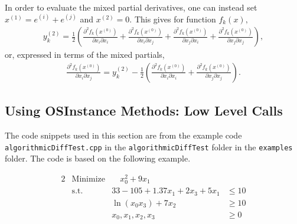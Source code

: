 \documentclass[11pt]{article}
\newcommand{\DD}[3]{ \frac{\partial^2 #1}{\partial #2 \partial #3} }
\renewcommand{\_}{{\char"5F}}
\renewcommand{\{}{{\char"7B}}
\renewcommand{\}}{{\char"7D}}
\renewcommand{\^}{{\char"0D}}
\renewcommand{\'}{{\char"0D}}
\begin{document}
\begin{enumerate}[Step 1:]
In order to evaluate the mixed partial derivatives, one can instead set $x^{(1)} = e^{(i)} + e^{(j)}$ and $x^{(2)} = 0.$    This gives for function $f_{k}(x),$
\begin{eqnarray}
y^{(2)}_{k} =  \frac{1}{2} \left( \DD{f_{k}(x^{(0)})}{x_{i}}{x_{i}}  +   \DD{f_{k}(x^{(0)})}{x_{i}}{x_{j}} 
+  \DD{f_{k}(x^{(0)})}{x_{j}}{x_{i}} +  \DD{f_{k}(x^{(0)})}{x_{j}}{x_{j}}  \right), \label{eq:forward2Resultb}
\end{eqnarray}
or, expressed in terms of the mixed partials,
\begin{eqnarray}
  \DD{f_{k}(x^{(0)})}{x_{i}}{x_{j}}  = y_{k}^{(2)}  -  \frac{1}{2} \left( \DD{f_{k}(x^{(0)})}{x_{i}}{x_{i}}  
+  \DD{f_{k}(x^{(0)})}{x_{j}}{x_{j}}  \right). \label{eq:forward2Resultc}
\end{eqnarray}




\subsection{Using OSInstance Methods: Low Level Calls}\label{section:lowlevelADcalls}

  The code snippets used in this section  are from the example code {\tt algorithmicDiffTest.cpp} in the
{\tt algorithmicDiffTest} folder in the {\tt examples} folder.  The  code is based on the following example.

\begin{alignat}{2}
& \mbox{Minimize} & \quad  x_{0}^{2} + 9x_{1} \label{eq:adobj}\\
& \mbox{s.t.} & 33 - 105 + 1.37 x_{1} + 2x_{3} + 5 x_{1} &\le 10  \label{eq:adeq0}\\
& & \ln(x_{0} x_{3}) + 7x_{2} &\ge 10 \label{eq:adeq1} \\
& & x_{0}, x_{1}, x_{2}, x_{3} &\ge 0 \label{eq:adeq2}
\end{alignat}


\end{enumerate}
\end{document}
